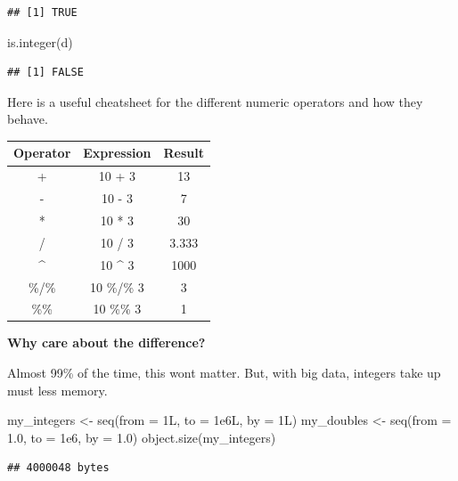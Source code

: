\documentclass[
]{book}
\newenvironment{Shaded}{\begin{snugshade}}{\end{snugshade}}
\newcommand{\AttributeTok}[1]{\textcolor[rgb]{0.77,0.63,0.00}{#1}}
\newcommand{\FloatTok}[1]{\textcolor[rgb]{0.00,0.00,0.81}{#1}}
\newcommand{\FunctionTok}[1]{\textcolor[rgb]{0.00,0.00,0.00}{#1}}
\newcommand{\NormalTok}[1]{#1}
\newcommand{\OtherTok}[1]{\textcolor[rgb]{0.56,0.35,0.01}{#1}}
\begin{document}
\begin{verbatim}
## [1] TRUE
\end{verbatim}

\begin{Shaded}
\begin{Highlighting}[]
\FunctionTok{is.integer}\NormalTok{(d)}
\end{Highlighting}
\end{Shaded}

\begin{verbatim}
## [1] FALSE
\end{verbatim}

Here is a useful cheatsheet for the different numeric operators and how they behave.

\begin{tabular}{c|c|c}
\hline
Operator & Expression & Result\\
\hline
+ & 10 + 3 & 13\\
\hline
- & 10 - 3 & 7\\
\hline
* & 10 * 3 & 30\\
\hline
/ & 10 / 3 & 3.333\\
\hline
\textasciicircum{} & 10 \textasciicircum{} 3 & 1000\\
\hline
\%/\% & 10 \%/\% 3 & 3\\
\hline
\%\% & 10 \%\% 3 & 1\\
\hline
\end{tabular}

\textbf{Why care about the difference?}

Almost 99\% of the time, this wont matter. But, with big data, integers take up must less memory.

\begin{Shaded}
\begin{Highlighting}[]
\NormalTok{my\_integers }\OtherTok{\textless{}{-}} \FunctionTok{seq}\NormalTok{(}\AttributeTok{from =}\NormalTok{ 1L, }\AttributeTok{to =} \FloatTok{1e6}\NormalTok{L, }\AttributeTok{by =}\NormalTok{ 1L)}
\NormalTok{my\_doubles }\OtherTok{\textless{}{-}} \FunctionTok{seq}\NormalTok{(}\AttributeTok{from =} \FloatTok{1.0}\NormalTok{, }\AttributeTok{to =} \FloatTok{1e6}\NormalTok{, }\AttributeTok{by =} \FloatTok{1.0}\NormalTok{)}
\FunctionTok{object.size}\NormalTok{(my\_integers)}
\end{Highlighting}
\end{Shaded}

\begin{verbatim}
## 4000048 bytes
\end{verbatim}
\end{document}
